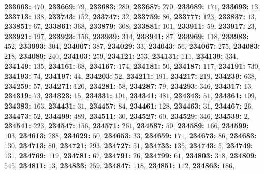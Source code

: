 \textsf{\bfseries 233663:} $470$, \textsf{\bfseries 233669:} $79$, \textsf{\bfseries 233683:} $280$, \textsf{\bfseries 233687:} $270$, \textsf{\bfseries 233689:} $171$, \textsf{\bfseries 233693:} $13$, \textsf{\bfseries 233713:} $138$, \textsf{\bfseries 233743:} $152$, \textsf{\bfseries 233747:} $32$, \textsf{\bfseries 233759:} $86$, \textsf{\bfseries 233777:} $123$, \textsf{\bfseries 233837:} $13$, \textsf{\bfseries 233851:} $67$, \textsf{\bfseries 233861:} $368$, \textsf{\bfseries 233879:} $308$, \textsf{\bfseries 233881:} $101$, \textsf{\bfseries 233911:} $59$, \textsf{\bfseries 233917:} $23$, \textsf{\bfseries 233921:} $197$, \textsf{\bfseries 233923:} $156$, \textsf{\bfseries 233939:} $314$, \textsf{\bfseries 233941:} $87$, \textsf{\bfseries 233969:} $118$, \textsf{\bfseries 233983:} $452$, \textsf{\bfseries 233993:} $304$, \textsf{\bfseries 234007:} $387$, \textsf{\bfseries 234029:} $33$, \textsf{\bfseries 234043:} $56$, \textsf{\bfseries 234067:} $275$, \textsf{\bfseries 234083:} $218$, \textsf{\bfseries 234089:} $240$, \textsf{\bfseries 234103:} $259$, \textsf{\bfseries 234121:} $253$, \textsf{\bfseries 234131:} $111$, \textsf{\bfseries 234139:} $334$, \textsf{\bfseries 234149:} $135$, \textsf{\bfseries 234161:} $68$, \textsf{\bfseries 234167:} $174$, \textsf{\bfseries 234181:} $50$, \textsf{\bfseries 234187:} $117$, \textsf{\bfseries 234191:} $730$, \textsf{\bfseries 234193:} $74$, \textsf{\bfseries 234197:} $44$, \textsf{\bfseries 234203:} $52$, \textsf{\bfseries 234211:} $191$, \textsf{\bfseries 234217:} $219$, \textsf{\bfseries 234239:} $638$, \textsf{\bfseries 234259:} $57$, \textsf{\bfseries 234271:} $120$, \textsf{\bfseries 234281:} $58$, \textsf{\bfseries 234287:} $79$, \textsf{\bfseries 234293:} $346$, \textsf{\bfseries 234317:} $13$, \textsf{\bfseries 234319:} $73$, \textsf{\bfseries 234323:} $15$, \textsf{\bfseries 234331:} $101$, \textsf{\bfseries 234341:} $481$, \textsf{\bfseries 234343:} $51$, \textsf{\bfseries 234361:} $109$, \textsf{\bfseries 234383:} $163$, \textsf{\bfseries 234431:} $31$, \textsf{\bfseries 234457:} $84$, \textsf{\bfseries 234461:} $128$, \textsf{\bfseries 234463:} $31$, \textsf{\bfseries 234467:} $26$, \textsf{\bfseries 234473:} $52$, \textsf{\bfseries 234499:} $489$, \textsf{\bfseries 234511:} $30$, \textsf{\bfseries 234527:} $60$, \textsf{\bfseries 234529:} $346$, \textsf{\bfseries 234539:} $2$, \textsf{\bfseries 234541:} $223$, \textsf{\bfseries 234547:} $156$, \textsf{\bfseries 234571:} $261$, \textsf{\bfseries 234587:} $50$, \textsf{\bfseries 234589:} $166$, \textsf{\bfseries 234599:} $103$, \textsf{\bfseries 234613:} $288$, \textsf{\bfseries 234629:} $50$, \textsf{\bfseries 234653:} $33$, \textsf{\bfseries 234659:} $171$, \textsf{\bfseries 234673:} $86$, \textsf{\bfseries 234683:} $130$, \textsf{\bfseries 234713:} $80$, \textsf{\bfseries 234721:} $293$, \textsf{\bfseries 234727:} $51$, \textsf{\bfseries 234733:} $135$, \textsf{\bfseries 234743:} $5$, \textsf{\bfseries 234749:} $131$, \textsf{\bfseries 234769:} $119$, \textsf{\bfseries 234781:} $67$, \textsf{\bfseries 234791:} $26$, \textsf{\bfseries 234799:} $61$, \textsf{\bfseries 234803:} $318$, \textsf{\bfseries 234809:} $545$, \textsf{\bfseries 234811:} $13$, \textsf{\bfseries 234833:} $259$, \textsf{\bfseries 234847:} $118$, \textsf{\bfseries 234851:} $112$, \textsf{\bfseries 234863:} $186$, 
